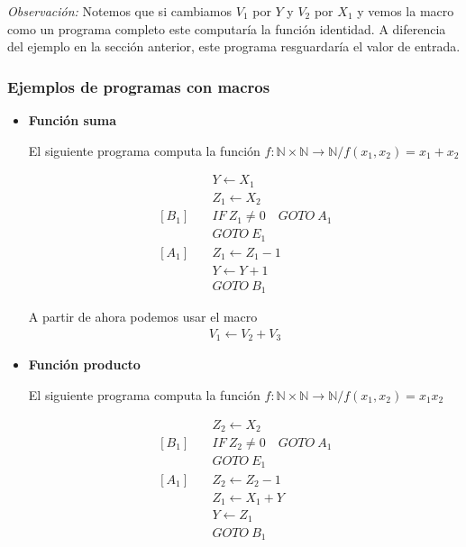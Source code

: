 \begin{itemize}
        \bigskip
        \textit{Observación:}
        Notemos que si cambiamos $V_1$ por $Y$ y $V_2$ por $X_1$ y vemos la
        macro como un programa completo este computaría la función identidad.
        A diferencia del ejemplo en la sección anterior, este programa 
        resguardaría el valor de entrada.
\end{itemize}

\subsubsection{Ejemplos de programas con macros}

\begin{itemize}
    \item \textbf{Función suma} \label{ej:funcion-suma}

        El siguiente programa computa la función 
        $f: \mathbb{N} \times \mathbb{N} \to \mathbb{N}/f(x_1, x_2) = x_1+x_2$

        \begin{align*}
                        &Y \gets X_1 \\
                        &Z_1 \gets X_2 \\
            [B_1] \quad &IF ~ Z_1 \neq 0 \quad GOTO ~ A_1 \\
                        &GOTO ~ E_1 \\
            [A_1] \quad &Z_1 \gets Z_1 - 1 \\
                        &Y \gets Y + 1 \\
                        &GOTO ~ B_1
        \end{align*}

        A partir de ahora podemos usar el macro
        \begin{gather*}
            V_1 \gets V_2 + V_3
        \end{gather*}

    \item \textbf{Función producto} \label{ej:funcion-producto}

        El siguiente programa computa la función 
        $f: \mathbb{N} \times \mathbb{N} \to \mathbb{N}/f(x_1, x_2) = x_1 x_2$

        \begin{align*}
                        &Z_2 \gets X_2 \\
            [B_1] \quad &IF ~ Z_2 \neq 0 \quad GOTO ~ A_1 \\
                        &GOTO ~ E_1 \\
            [A_1] \quad &Z_2 \gets Z_2 - 1 \\
                        &Z_1 \gets X_1 + Y \\
                        &Y \gets Z_1 \\
                        &GOTO ~ B_1
        \end{align*}


\end{itemize}
